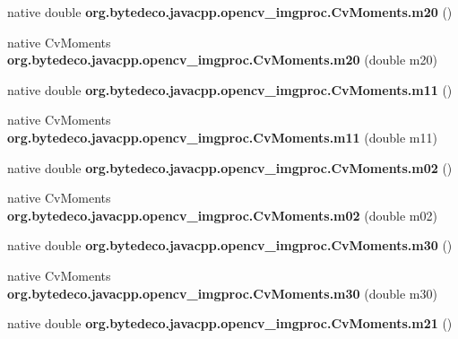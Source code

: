 \begin{DoxyCompactItemize}
\mbox{\label{group__imgproc_ga22adb735558f63057fbc60eb45fa7c57}} 
native double {\bfseries org.\+bytedeco.\+javacpp.\+opencv\+\_\+imgproc.\+Cv\+Moments.\+m20} ()
\item 
\mbox{\label{group__imgproc_ga2cf7e4b252500810eef93d8f9d1904c9}} 
native Cv\+Moments {\bfseries org.\+bytedeco.\+javacpp.\+opencv\+\_\+imgproc.\+Cv\+Moments.\+m20} (double m20)
\item 
\mbox{\label{group__imgproc_ga5917568d067446ed5c5bbf0078de2820}} 
native double {\bfseries org.\+bytedeco.\+javacpp.\+opencv\+\_\+imgproc.\+Cv\+Moments.\+m11} ()
\item 
\mbox{\label{group__imgproc_gacdbd4707131541e3b745aaf4c7ea4114}} 
native Cv\+Moments {\bfseries org.\+bytedeco.\+javacpp.\+opencv\+\_\+imgproc.\+Cv\+Moments.\+m11} (double m11)
\item 
\mbox{\label{group__imgproc_ga44da59a5834d0093c16994622750376e}} 
native double {\bfseries org.\+bytedeco.\+javacpp.\+opencv\+\_\+imgproc.\+Cv\+Moments.\+m02} ()
\item 
\mbox{\label{group__imgproc_ga4837c87859f3e265044b17f69f4a0dd4}} 
native Cv\+Moments {\bfseries org.\+bytedeco.\+javacpp.\+opencv\+\_\+imgproc.\+Cv\+Moments.\+m02} (double m02)
\item 
\mbox{\label{group__imgproc_ga70f61955ad1f45726a8f5e11c5721ba9}} 
native double {\bfseries org.\+bytedeco.\+javacpp.\+opencv\+\_\+imgproc.\+Cv\+Moments.\+m30} ()
\item 
\mbox{\label{group__imgproc_gaf24dcf7b8064a51896b755ab836d9ee7}} 
native Cv\+Moments {\bfseries org.\+bytedeco.\+javacpp.\+opencv\+\_\+imgproc.\+Cv\+Moments.\+m30} (double m30)
\item 
\mbox{\label{group__imgproc_gaaad5399aa7b4199c8a336e552ad5e593}} 
native double {\bfseries org.\+bytedeco.\+javacpp.\+opencv\+\_\+imgproc.\+Cv\+Moments.\+m21} ()
\item 
\mbox{\label{group__imgproc_gaa8727482b85968cc07c90e00bda8264b}} 

\end{DoxyCompactItemize}
